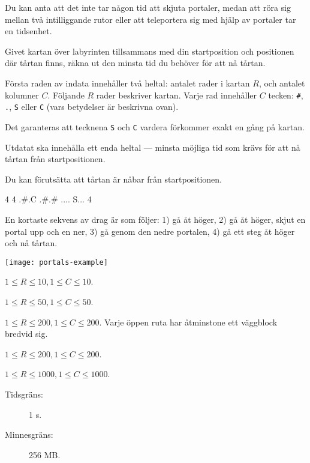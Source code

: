 \documentclass{boi2014-se}
\newcommand{\constant}[1]{{\tt #1}}
\begin{document}
    Du kan anta att det inte tar någon tid att skjuta portaler, medan att
    röra sig mellan två intilliggande rutor eller att teleportera sig med
    hjälp av portaler tar en tidsenhet.

    \Task
    Givet kartan över labyrinten tillsammans med din startposition och positionen
    där tårtan finns, räkna ut den minsta tid du behöver för att nå tårtan.

    \Input
    Första raden av indata innehåller två heltal: antalet rader i kartan $R$,
    och antalet kolumner $C$. Följande $R$ rader beskriver kartan. Varje rad
    innehåller $C$ tecken: \constant{\#}, \constant{.}, \constant{S} eller
    \constant{C} (vars betydelser är beskrivna ovan).

    Det garanteras att tecknena \constant{S} och \constant{C} vardera förkommer
    exakt en gång på kartan.

    \Output
    Utdatat ska innehålla ett enda heltal --- minsta möjliga tid som krävs för att nå
    tårtan från startpositionen.

    Du kan förutsätta att tårtan är nåbar från startpositionen.

    \Example
    \example
    {
        4 4\newline
        .\#.C\newline
        .\#.\#\newline
        ....\newline
        S...
    }
    {
        4
    }
    {
        En kortaste sekvens av drag är som följer: 1) gå åt höger, 2) gå åt
        höger, skjut en portal upp och en ner, 3) gå genom den nedre portalen,
        4) gå ett steg åt höger och nå tårtan.

        \begin{center}
            \texttt{[image: portals-example]}
        \end{center}
    }

    \Scoring

    \begin{description}[leftmargin=0pt]
        \item[Deluppgift 1 (11 poäng):] $1 \le R \le 10, 1 \le C \le 10$.
        \item[Deluppgift 2 (20 poäng):] $1 \le R \le 50, 1 \le C \le 50$.
        \item[Deluppgift 3 (20 poäng):] $1 \le R \le 200, 1 \le C \le 200$.
        Varje öppen ruta har åtminstone ett väggblock bredvid sig.
        \item[Deluppgift 4 (19 poäng):] $1 \le R \le 200, 1 \le C \le 200$.
        \item[Deluppgift 5 (30 poäng):] $1 \le R \le 1000, 1 \le C \le 1000$.
    \end{description}

    \Constraints

    \begin{description}
        \item[Tidsgräns:] 1 s.
        \item[Minnesgräns:] 256 MB.
    \end{description}
\end{document}
